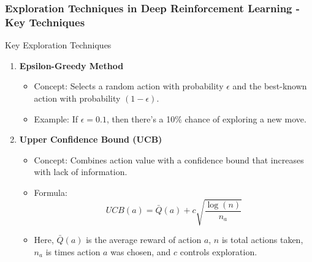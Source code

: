 \documentclass[aspectratio=169]{beamer}
\begin{document}
\begin{frame}[fragile]
    \frametitle{Exploration Techniques in Deep Reinforcement Learning - Key Techniques}
    \begin{block}{Key Exploration Techniques}
        \begin{enumerate}
            \item \textbf{Epsilon-Greedy Method}
                \begin{itemize}
                    \item Concept: Selects a random action with probability $\epsilon$ and the best-known action with probability $(1-\epsilon)$.
                    \item Example: If $\epsilon = 0.1$, then there’s a 10\% chance of exploring a new move.
                \end{itemize}
            \item \textbf{Upper Confidence Bound (UCB)}
                \begin{itemize}
                    \item Concept: Combines action value with a confidence bound that increases with lack of information.
                    \item Formula: 
                    \begin{equation}
                        UCB(a) = \bar{Q}(a) + c \sqrt{\frac{\log(n)}{n_a}}
                    \end{equation}
                    \item Here, $\bar{Q}(a)$ is the average reward of action $a$, $n$ is total actions taken, $n_a$ is times action $a$ was chosen, and $c$ controls exploration.
                \end{itemize}
        \end{enumerate}
    \end{block}
\end{frame}
\end{document}
